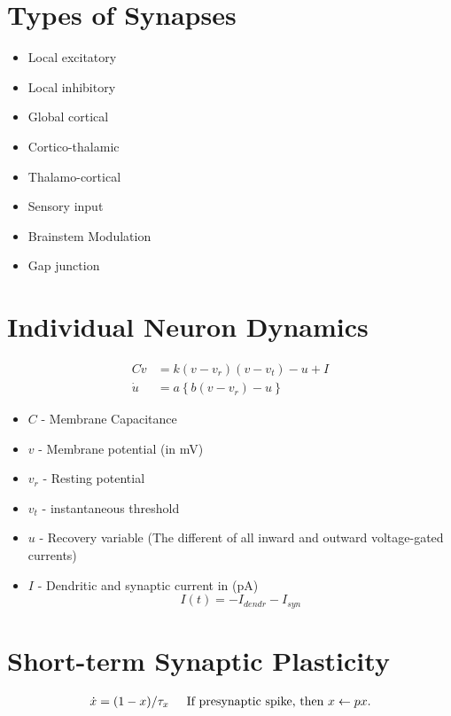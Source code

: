 \documentclass{article}
\begin{document}
\section{Types of Synapses}
	\begin{itemize}
		\item Local excitatory
		\item Local inhibitory
		\item Global cortical
		\item Cortico-thalamic
		\item Thalamo-cortical
		\item Sensory input
		\item Brainstem Modulation
		\item Gap junction
	\end{itemize}

\section{Individual Neuron Dynamics}


\begin{align}
C\dot{v} &= k(v-v_r)(v-v_t) - u + I \\
\dot{u} &= a\left\{ b(v-v_r) - u\right\}
\end{align}

\begin{itemize}
	\item $C$ - Membrane Capacitance 
	\item $v$ - Membrane potential (in mV)
	\item $v_r$ - Resting potential 
	\item $v_t$ - instantaneous threshold
	\item $u$ - Recovery variable (The different of all inward and outward voltage-gated currents)
	\item $I$ - Dendritic and synaptic current in (pA)
	\[I(t) = -I_{dendr} - I_{syn}\]
\end{itemize}

\section{Short-term Synaptic Plasticity}
 
\begin{align}
\dot{x} = (1-x)/\tau_x \hspace{5 mm} \text{If presynaptic spike, then } x \leftarrow px.
\end{align}
\end{document}
